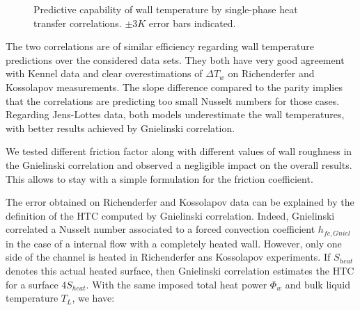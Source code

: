 \begin{figure}[h!]
\centering
{} 
\caption{Predictive capability of wall temperature by single-phase heat transfer correlations. $\pm 3K$ error bars indicated.}
\label{fig:dittus_gniel_htc}
\end{figure}

\npar
The two correlations are of similar efficiency regarding wall temperature predictions over the considered data sets. They both have very good agreement with Kennel data and clear overestimations of $\Delta T_{w}$ on Richenderfer and Kossolapov measurements. The slope difference compared to the parity implies that the correlations are predicting too small Nusselt numbers for those cases. Regarding Jens-Lottes data, both models underestimate the wall temperatures, with better results achieved by Gnielinski correlation.

\begin{remark*}{}
We tested different friction factor along with different values of wall roughness in the Gnielinski correlation and observed a negligible impact on the overall results. This allows to stay with a simple formulation for the friction coefficient.
\end{remark*}

\npar

The error obtained on Richenderfer and Kossolapov data can be explained by the definition of the HTC computed by Gnielinski correlation. Indeed, Gnielinski correlated a Nusselt number associated to a forced convection coefficient $h_{fc,Gniel}$ in the case of a internal flow with a completely heated wall. However, only one side of the channel is heated in Richenderfer ans Kossolapov experiments. If $S_{heat}$ denotes this actual heated surface, then Gnielinski correlation estimates the HTC for a surface $4S_{heat}$. With the same imposed total heat power $\Phi_{w}$ and bulk liquid temperature $T_{L}$, we have:

